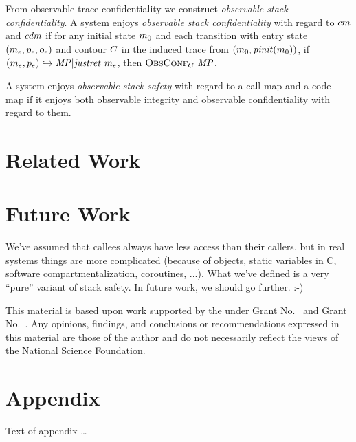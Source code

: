 \documentclass[acmsmall,review,anonymous]{acmart}\settopmatter{printfolios=true,printccs=false,printacmref=false}
\begin{document}

      From observable trace confidentiality we construct {\em observable stack
      confidentiality}. A system enjoys {\em observable stack confidentiality}
      with regard to \(cm\) and \(\mathit{cdm}\) if for any initial state
      \(m_0\) and each transition with entry state
      \((m_e,p_e,o_e)\) and contour \(C\) in the
      induced trace from \((m_0,\mathit{pinit}(m_0))\), if
      \((m_e,p_e) \hookrightarrow \mathit{MP} | \mathit{justret}\ m_e\),
      then \(\text{\sc ObsConf}_C ~ \mathit{MP}\).


      A system enjoys {\em observable stack safety} with regard to a call map
      and a code map if it enjoys both observable integrity and observable
      confidentiality with regard to them.


\section{Related Work}
\label{sec:relwork}

\section{Future Work}
\label{sec:future}

We've assumed that callees always have less access than their callers, but
in real systems things are more complicated (because of objects, static
variables in C, software compartmentalization, coroutines, ...).  What we've
defined is a very ``pure'' variant of stack safety.  In future work, we
should go further. :-)


\begin{acks}                            %
  This material is based upon work supported by the
   under Grant
  No.~ and Grant
  No.~.  Any opinions, findings, and
  conclusions or recommendations expressed in this material are those
  of the author and do not necessarily reflect the views of the
  National Science Foundation.
\end{acks}


%


\appendix
\section{Appendix}

Text of appendix \ldots
\end{document}
